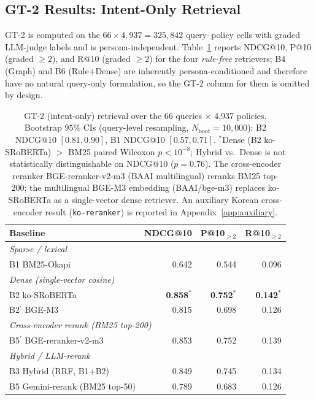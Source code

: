 \documentclass{article}
\newcommand{\npolicy}{4{,}937}
\newcommand{\nquery}{66}
\begin{document}
\subsection{GT-2 Results: Intent-Only Retrieval}
\label{sec:exp:gt2}

GT-2 is computed on the $\nquery{}\times\npolicy{}{=}325{,}842$
query--policy cells with graded LLM-judge labels and is
persona-independent. Table~\ref{tab:gt2} reports NDCG@10, P@10
(graded $\geq{}2$), and R@10 (graded $\geq{}2$) for the four
\emph{rule-free} retrievers; B4 (Graph) and B6 (Rule$+$Dense) are
inherently persona-conditioned and therefore have no natural
query-only formulation, so the GT-2 column for them is omitted by
design.

\begin{table}[t]
\centering\scriptsize
\setlength{\tabcolsep}{3pt}
\begin{tabular}{lrrr}
\toprule
Baseline & NDCG@10 & P@10$_{\geq 2}$ & R@10$_{\geq 2}$ \\
\midrule
\multicolumn{4}{l}{\emph{Sparse / lexical}} \\
B1 BM25-Okapi & 0.642 & 0.544 & 0.096 \\
\midrule
\multicolumn{4}{l}{\emph{Dense (single-vector cosine)}} \\
B2 ko-SRoBERTa            & \textbf{0.858}$^*$ & \textbf{0.752}$^*$ & \textbf{0.142}$^*$ \\
B2$^\prime$ BGE-M3        & 0.815 & 0.698 & 0.126 \\
\midrule
\multicolumn{4}{l}{\emph{Cross-encoder rerank (BM25 top-200)}} \\
B5$^\prime$ BGE-reranker-v2-m3   & 0.853 & 0.752 & 0.139 \\
\midrule
\multicolumn{4}{l}{\emph{Hybrid / LLM-rerank}} \\
B3 Hybrid (RRF, B1$+$B2)  & 0.849 & 0.745 & 0.134 \\
B5 Gemini-rerank (BM25 top-50)   & 0.789 & 0.683 & 0.126 \\
\bottomrule
\end{tabular}
\caption{GT-2 (intent-only) retrieval over the 66 queries $\times$
\npolicy{} policies. Bootstrap $95\%$ CIs (query-level resampling,
$N_{\mathrm{boot}}{=}10{,}000$): B2 NDCG@10 $[0.81, 0.90]$, B1 NDCG@10
$[0.57, 0.71]$. $^*$Dense (B2 ko-SRoBERTa) $>$ BM25 paired Wilcoxon
$p{<}10^{-8}$; Hybrid vs.\ Dense is not statistically distinguishable
on NDCG@10 ($p{=}0.76$). The cross-encoder reranker
BGE-reranker-v2-m3 (BAAI multilingual) reranks BM25 top-200; the
multilingual BGE-M3 embedding (BAAI/bge-m3) replaces ko-SRoBERTa as
a single-vector dense retriever. An auxiliary Korean cross-encoder
result (\texttt{ko-reranker}) is reported in
Appendix~\ref{app:auxiliary}.}
\label{tab:gt2}
\end{table}
\end{document}
